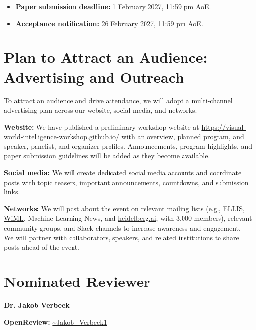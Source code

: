 \documentclass[11pt]{article}
\begin{document}
\begin{itemize}

\item \textbf{Paper submission deadline:} 1 February 2027, 11:59 pm AoE.

\item \textbf{Acceptance notification:} 26 February 2027, 11:59 pm AoE.

\end{itemize}

\section{Plan to Attract an Audience: Advertising and Outreach}

To attract an audience and drive attendance, we will adopt a multi-channel advertising plan across our website, social media, and networks.


\textbf{Website:} We have published a preliminary workshop website at \href{https://visual-world-intelligence-workshop.github.io/}{https://visual-world-intelligence-workshop.github.io/} with an overview, planned program, and speaker, panelist, and organizer profiles. Announcements, program highlights, and paper submission guidelines will be added as they become available.


\textbf{Social media:} We will create dedicated social media accounts and coordinate posts with topic teasers, important announcements, countdowns, and submission links.


\textbf{Networks:} We will post about the event on relevant mailing lists (e.g., \href{https://ellis.eu}{ELLIS}, \href{https://www.wiml.org/}{WiML}, Machine Learning News, and \href{http://heidelberg.ai}{heidelberg.ai}, with 3,000 members), relevant community groups, and Slack channels to increase awareness and engagement. We will partner with collaborators, speakers, and related institutions to share posts ahead of the event.


\section{Nominated Reviewer}

\textbf{Dr. Jakob Verbeek}


\textbf{OpenReview:} \href{https://openreview.net/profile?id=\string~Jakob\_Verbeek1}{\textasciitilde{}Jakob\_Verbeek1}
\end{document}

